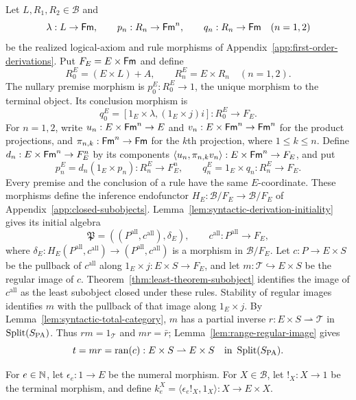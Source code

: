 Let $L,R_1,R_2\in\mathcal B$ and
\[
 \lambda:L\to\mathsf{Fm},\qquad
 p_n:R_n\to\mathsf{Fm}^n,\qquad q_n:R_n\to\mathsf{Fm}\quad(n=1,2)
\]
be the realized logical-axiom and rule morphisms of
Appendix~\ref{app:first-order-derivations}.
Put $F_E=E\times\mathsf{Fm}$ and define
\[
 R^E_0=(E\times L)+A,\qquad
 R^E_n=E\times R_n\quad(n=1,2).
\]
The nullary premise morphism is $p^E_0:R^E_0\to1$, the
unique morphism to the terminal object. Its conclusion morphism is
\[
 q^E_0=[1_E\times\lambda,(1_E\times j)i]:R^E_0\to F_E.
\]
For $n=1,2$, write
$u_n:E\times\mathsf{Fm}^n\to E$ and
$v_n:E\times\mathsf{Fm}^n\to\mathsf{Fm}^n$ for the product projections,
and $\pi_{n,k}:\mathsf{Fm}^n\to\mathsf{Fm}$ for the $k$th projection,
where $1\le k\le n$.
Define $d_n:E\times\mathsf{Fm}^n\to F_E^n$ by its components
$\langle u_n,\pi_{n,k}v_n\rangle:E\times\mathsf{Fm}^n\to F_E$,
and put
\[
 p^E_n=d_n(1_E\times p_n):R_n^E\to F_E^n,\qquad
 q^E_n=1_E\times q_n:R_n^E\to F_E.
\]
Every premise and the conclusion of a rule have the same
$E$-coordinate. These morphisms define the inference endofunctor
$H_E:\mathcal B/F_E\to\mathcal B/F_E$
of Appendix~\ref{app:closed-subobjects}.
Lemma~\ref{lem:syntactic-derivation-initiality} gives its
initial algebra
\[
 \mathfrak P=((P^{\mathrm{all}},c^{\mathrm{all}}),\delta_E),
 \qquad c^{\mathrm{all}}:P^{\mathrm{all}}\to F_E,
\]
where
$\delta_E:H_E(P^{\mathrm{all}},c^{\mathrm{all}})
             \to(P^{\mathrm{all}},c^{\mathrm{all}})$
is a morphism in $\mathcal B/F_E$.
Let $c:P\to E\times S$ be the pullback of $c^{\mathrm{all}}$
along $1_E\times j:E\times S\to F_E$, and let
$m:\mathcal T\hookrightarrow E\times S$ be the regular image
of $c$. Theorem~\ref{thm:least-theorem-subobject} identifies
the image of $c^{\mathrm{all}}$ as the least subobject closed
under these rules. Stability of regular images identifies
$m$ with the pullback of that image along $1_E\times j$.
By Lemma~\ref{lem:syntactic-total-category}, $m$ has a partial
inverse $r:E\times S\rightharpoonup\mathcal T$ in
$\operatorname{Split}(S_{\mathrm{PA}})$. Thus $rm=1_{\mathcal T}$ and $mr=\bar r$;
Lemma~\ref{lem:range-regular-image} gives
\[
 t=mr=\operatorname{ran}(c):E\times S\rightharpoonup E\times S
 \quad\text{in }\operatorname{Split}(S_{\mathrm{PA}}).
\]

For $e\in\mathbb N$, let $\epsilon_e:1\to E$ be the numeral
morphism. For $X\in\mathcal B$, let $!_X:X\to1$ be the
terminal morphism, and define
$k_e^X=\langle\epsilon_e!_X,1_X\rangle:X\to E\times X$.

